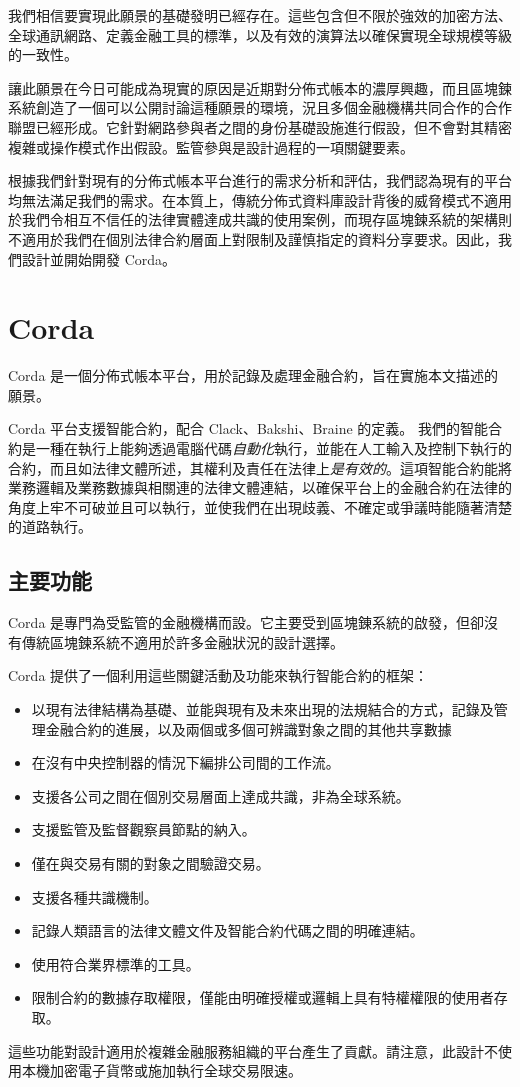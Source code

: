 \documentclass[UTF8]{ctexart}
\begin{document}
我們相信要實現此願景的基礎發明已經存在。這些包含但不限於強效的加密方法、全球通訊網路、定義金融工具的標準，以及有效的演算法以確保實現全球規模等級的一致性。 

讓此願景在今日可能成為現實的原因是近期對分佈式帳本的濃厚興趣，而且區塊鍊系統創造了一個可以公開討論這種願景的環境，況且多個金融機構共同合作的合作聯盟已經形成。它針對網路參與者之間的身份基礎設施進行假設，但不會對其精密複雜或操作模式作出假設。監管參與是設計過程的一項關鍵要素。

根據我們針對現有的分佈式帳本平台進行的需求分析和評估，我們認為現有的平台均無法滿足我們的需求。在本質上，傳統分佈式資料庫設計背後的威脅模式不適用於我們令相互不信任的法律實體達成共識的使用案例，而現存區塊鍊系統的架構則不適用於我們在個別法律合約層面上對限制及謹慎指定的資料分享要求。因此，我們設計並開始開發 Corda。

\section{Corda}
Corda 是一個分佈式帳本平台，用於記錄及處理金融合約，旨在實施本文描述的願景。  

Corda 平台支援智能合約，配合 Clack、Bakshi、Braine 的定義。\cite{SCT} 我們的智能合約是一種在執行上能夠透過電腦代碼\textit{自動化}執行，並能在人工輸入及控制下執行的合約，而且如法律文體所述，其權利及責任在法律上\textit{是有效的}。這項智能合約能將業務邏輯及業務數據與相關連的法律文體連結，以確保平台上的金融合約在法律的角度上牢不可破並且可以執行，並使我們在出現歧義、不確定或爭議時能隨著清楚的道路執行。

\subsection{主要功能}
Corda 是專門為受監管的金融機構而設。它主要受到區塊錬系統的啟發，但卻沒有傳統區塊鍊系統不適用於許多金融狀況的設計選擇。 

Corda 提供了一個利用這些關鍵活動及功能來執行智能合約的框架：
\begin{itemize}
    \item{以現有法律結構為基礎、並能與現有及未來出現的法規結合的方式，記錄及管理金融合約的進展，以及兩個或多個可辨識對象之間的其他共享數據}
    \item{在沒有中央控制器的情況下編排公司間的工作流。}
    \item{支援各公司之間在個別交易層面上達成共識，非為全球系統。}
    \item{支援監管及監督觀察員節點的納入。}
    \item{僅在與交易有關的對象之間驗證交易。}
    \item{支援各種共識機制。}
    \item{記錄人類語言的法律文體文件及智能合約代碼之間的明確連結。}
    \item{使用符合業界標準的工具。}
    \item{限制合約的數據存取權限，僅能由明確授權或邏輯上具有特權權限的使用者存取。}
\end{itemize}
這些功能對設計適用於複雜金融服務組織的平台產生了貢獻。請注意，此設計不使用本機加密電子貨幣或施加執行全球交易限速。
\end{document}
